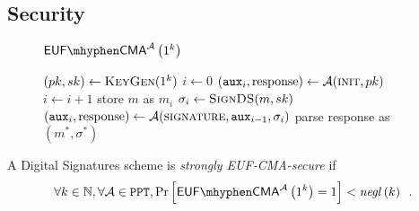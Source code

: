   \subsection{Security}
    \begin{figure}[H]
      \begin{gamebox}{$\mathsf{EUF \mhyphen CMA}^{\adversary}\left(1^k\right)$}
        \begin{algorithmic}[1]
          \State $(pk, sk) \gets \textsc{KeyGen}(1^k)$
          \State $i \gets 0$
          \State $(\mathtt{aux}_i, \mathrm{response}) \gets
          \mathcal{A}(\textsc{init}, pk)$
            \State $i \gets i + 1$
            \State store $m$ as $m_i$
            \State $\sigma_i \gets \textsc{SignDS}(m, sk)$
            \State $(\mathtt{aux}_i, \mathrm{response}) \gets
            \mathcal{A}(\textsc{signature}, \mathtt{aux}_{i-1}, \sigma_i)$
          \EndWhile
          \State parse response as $(m^*, \sigma^*)$
            \State {}
          \Else
            \State {}
          \EndIf
        \end{algorithmic}
      \end{gamebox}
      \caption{}
      \label{game:ds}
    \end{figure}
    \begin{definition}
      \label{def:ds:secure}
      A Digital Signatures scheme is \emph{strongly \textsf{EUF-CMA}-secure} if
      \begin{equation*}
        \forall k \in \mathbb{N}, \forall \adversary \in \mathtt{PPT},
        \Pr\left[\mathsf{EUF \mhyphen CMA}^{\adversary}\left(1^k\right) =
        1\right] < \mathit{negl}\left(k\right) \enspace.
      \end{equation*}
    \end{definition}
